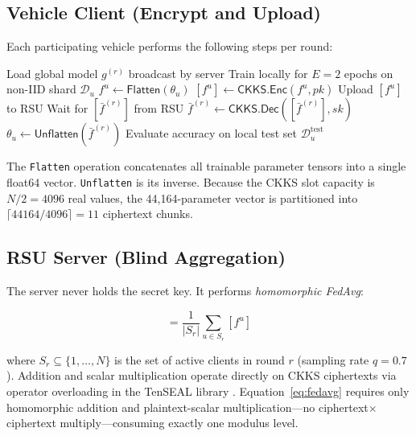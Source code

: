 \documentclass[conference]{IEEEtran}
\begin{document}
\subsection{Vehicle Client (Encrypt and Upload)}

Each participating vehicle performs the following steps per round:

\begin{algorithm}
\caption{Vehicle Client --- Round $r$}
\begin{algorithmic}[1]
  \STATE Load global model $g^{(r)}$ broadcast by server
  \STATE Train locally for $E{=}2$ epochs on non-IID shard $\mathcal{D}_u$
  \STATE $f^u \leftarrow \mathsf{Flatten}(\theta_u)$ \quad{}
  \STATE $[f^u] \leftarrow \mathsf{CKKS.Enc}(f^u, pk)$
  \STATE Upload $[f^u]$ to RSU
  \STATE Wait for $[\bar{f}^{(r)}]$ from RSU
  \STATE $\bar{f}^{(r)} \leftarrow \mathsf{CKKS.Dec}([\bar{f}^{(r)}], sk)$
  \STATE $\theta_u \leftarrow \mathsf{Unflatten}(\bar{f}^{(r)})$
  \STATE Evaluate accuracy on local test set $\mathcal{D}_u^{\mathrm{test}}$
\end{algorithmic}
\end{algorithm}

The \texttt{Flatten} operation concatenates all trainable parameter tensors
into a single float64 vector. \texttt{Unflatten} is its inverse. Because the
CKKS slot capacity is $N/2{=}4096$ real values, the 44,164-parameter vector
is partitioned into $\lceil 44164/4096 \rceil = 11$ ciphertext chunks.

\subsection{RSU Server (Blind Aggregation)}

The server never holds the secret key. It performs \emph{homomorphic FedAvg}:

\begin{equation}
  [\bar{f}^{(r)}] = \frac{1}{|S_r|} \sum_{u \in S_r} [f^u]
  \label{eq:fedavg}
\end{equation}

\noindent where $S_r \subseteq \{1,\ldots,N\}$ is the set of active clients
in round $r$ (sampling rate $q{=}0.7$). Addition and scalar multiplication
operate directly on CKKS ciphertexts via operator overloading in the
TenSEAL library \cite{tenseal2021}. Equation~\eqref{eq:fedavg} requires only
homomorphic addition and plaintext-scalar multiplication---no
ciphertext$\times$ciphertext multiply---consuming exactly one modulus level.
\end{document}
